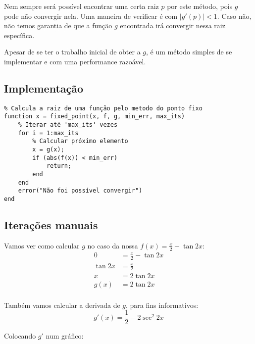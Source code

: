 \documentclass[12pt]{article}
\begin{document}
Nem sempre será possível encontrar uma certa raiz \(p\) por este método, pois \(g\) pode não convergir nela. Uma maneira de verificar é com \(|g'(p)| < 1\). Caso não, não temos garantia de que a função \(g\) encontrada irá convergir nessa raiz específica.

Apesar de se ter o trabalho inicial de obter a \(g\), é um método simples de se implementar e com uma performance razoável.

\subsection{Implementação}
\begin{verbatim}
% Calcula a raiz de uma função pelo metodo do ponto fixo
function x = fixed_point(x, f, g, min_err, max_its)
    % Iterar até 'max_its' vezes
    for i = 1:max_its
        % Calcular próximo elemento
        x = g(x);
        if (abs(f(x)) < min_err)
            return;
        end
    end
    error("Não foi possível convergir")
end
\end{verbatim}

\subsection{Iterações manuais}
Vamos ver como calcular \(g\) no caso da nossa \(f(x) = \frac{x}{2}-\tan{2x}\):
\begin{align*}
    0 &= \frac{x}{2}-\tan{2x} \\
    \tan{2x} &= \frac{x}{2} \\
    x &= 2\tan{2x} \\
    g(x) &= 2\tan{2x} \\
\end{align*}

Também vamos calcular a derivada de \(g\), para fins informativos:
\[g'(x) = \frac{1}{2} - 2\sec^2{2x}\]

Colocando \(g'\) num gráfico:

\begin{center}
\end{center}
\end{document}
